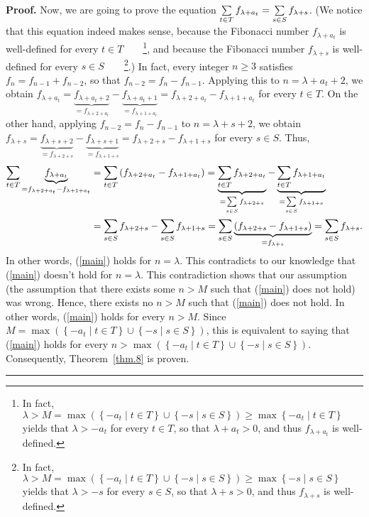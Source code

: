 \documentclass[numbers=enddot,12pt,final,onecolumn,notitlepage]{scrartcl}%
\numberwithin{exer}{section}
\theoremstyle{definition}
\newenvironment{proof}[1][Proof]{\noindent\textbf{#1.} }{\ \rule{0.5em}{0.5em}}
\let\sumnonlimits\sum
\renewcommand{\sum}{\sumnonlimits\limits}
\begin{document}
\begin{proof}
Now, we are going to prove the equation $\sum\limits_{t\in T}f_{\lambda+a_{t}%
}=\sum\limits_{s\in S}f_{\lambda+s}$. (We notice that this equation indeed
makes sense, because the Fibonacci number $f_{\lambda+a_{t}}$ is well-defined
for every $t\in T$\ \ \ \ \footnote{In fact, $\lambda>M=\max\left(  \left\{
-a_{t}\mid t\in T\right\}  \cup\left\{  -s\mid s\in S\right\}  \right)
\geq\max\left\{  -a_{t}\mid t\in T\right\}  $ yields that $\lambda>-a_{t}$ for
every $t\in T$, so that $\lambda+a_{t}>0$, and thus $f_{\lambda+a_{t}}$ is
well-defined.}, and because the Fibonacci number $f_{\lambda+s}$ is
well-defined for every $s\in S$\ \ \ \ \footnote{In fact, $\lambda
>M=\max\left(  \left\{  -a_{t}\mid t\in T\right\}  \cup\left\{  -s\mid s\in
S\right\}  \right)  \geq\max\left\{  -s\mid s\in S\right\}  $ yields that
$\lambda>-s$ for every $s\in S$, so that $\lambda+s>0$, and thus
$f_{\lambda+s}$ is well-defined.}.) In fact, every integer $n\geq3$ satisfies
$f_{n}=f_{n-1}+f_{n-2}$, so that $f_{n-2}=f_{n}-f_{n-1}$. Applying this to
$n=\lambda+a_{t}+2$, we obtain $f_{\lambda+a_{t}}=\underbrace{f_{\lambda
+a_{t}+2}}_{=f_{\lambda+2+a_{t}}}-\underbrace{f_{\lambda+a_{t}+1}%
}_{=f_{\lambda+1+a_{t}}}=f_{\lambda+2+a_{t}}-f_{\lambda+1+a_{t}}$ for every
$t\in T$. On the other hand, applying $f_{n-2}=f_{n}-f_{n-1}$ to
$n=\lambda+s+2$, we obtain $f_{\lambda+s}=\underbrace{f_{\lambda+s+2}%
}_{=f_{\lambda+2+s}}-\underbrace{f_{\lambda+s+1}}_{=f_{\lambda+1+s}%
}=f_{\lambda+2+s}-f_{\lambda+1+s}$ for every $s\in S$. Thus,%
\begin{align*}
\sum\limits_{t\in T}\underbrace{f_{\lambda+a_{t}}}_{=f_{\lambda+2+a_{t}%
}-f_{\lambda+1+a_{t}}}  &  =\sum\limits_{t\in T}\left(  f_{\lambda+2+a_{t}%
}-f_{\lambda+1+a_{t}}\right)  =\underbrace{\sum\limits_{t\in T}f_{\lambda
+2+a_{t}}}_{=\sum\limits_{s\in S}f_{\lambda+2+s}}-\underbrace{\sum
\limits_{t\in T}f_{\lambda+1+a_{t}}}_{=\sum\limits_{s\in S}f_{\lambda+1+s}}\\
&  =\sum\limits_{s\in S}f_{\lambda+2+s}-\sum\limits_{s\in S}f_{\lambda
+1+s}=\sum\limits_{s\in S}\underbrace{\left(  f_{\lambda+2+s}-f_{\lambda
+1+s}\right)  }_{=f_{\lambda+s}}=\sum\limits_{s\in S}f_{\lambda+s}.
\end{align*}
In other words, (\ref{main}) holds for $n=\lambda$. This contradicts to our
knowledge that (\ref{main}) doesn't hold for $n=\lambda$. This contradiction
shows that our assumption (the assumption that there exists some $n>M$ such
that (\ref{main}) does not hold) was wrong. Hence, there exists no $n>M$ such
that (\ref{main}) does not hold. In other words, (\ref{main}) holds for every
$n>M$. Since $M=\max\left(  \left\{  -a_{t}\mid t\in T\right\}  \cup\left\{
-s\mid s\in S\right\}  \right)  $, this is equivalent to saying that
(\ref{main}) holds for every $n>\max\left(  \left\{  -a_{t}\mid t\in
T\right\}  \cup\left\{  -s\mid s\in S\right\}  \right)  $. Consequently,
Theorem~\ref{thm.8} is proven.
\end{proof}
\end{document}
